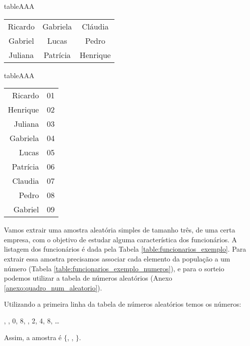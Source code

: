 \documentclass[11pt,fleqn]{book}
\numberwithin{mpicture}{chapter}
\numberwithin{mtable}{chapter}
\numberwithin{mframe}{chapter}
\begin{document}
\begin{sidepicture}{0}{table}{AAA}
	\label{table:funcionarios_exemplo}
	\begin{tabular}{ccc}\\\toprule
		Ricardo & Gabriela & Cláudia\\
		Gabriel & Lucas & Pedro\\
		Juliana & Patrícia & Henrique\\\bottomrule
	\end{tabular}
\end{sidepicture}

\begin{sidepicture}{-4cm}{table}{AAA}
	\label{table:funcionarios_exemplo_numeros}
	\begin{tabular}{rl}\\\toprule
		Ricardo & 01 \\
		Henrique & 02 \\
		Juliana & 03\\
		Gabriela & 04\\
		Lucas & 05\\
		Patrícia & 06\\
		Claudia & 07\\
		Pedro & 08\\
		Gabriel & 09\\\bottomrule
	\end{tabular}
\end{sidepicture}

\begin{example}
	\label{example:amostra_aleatoria_simples}
	Vamos extrair uma amostra aleatória simples de tamanho três, de uma certa empresa, com o objetivo de estudar alguma característica dos funcionários. A listagem dos funcionários é dada pela Tabela \ref{table:funcionarios_exemplo}. Para extrair essa amostra precisamos associar cada elemento da população a um número (Tabela \ref{table:funcionarios_exemplo_numeros}), e para o sorteio podemos utilizar a tabela de números aleatórios (Anexo \ref{anexo:quadro_num_aleatorio}).
	
	Utilizando a primeira linha da tabela de números aleatórios temos os números:
	\begin{center}
		, , 0, 8, , 2, 4, 8, \dots
	\end{center}
	
	Assim, a amostra é $\{$, , $\}$.
\end{example}
\end{document}
